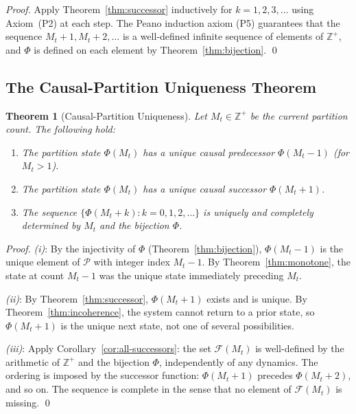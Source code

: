 \documentclass[twocolumn,10pt,a4paper]{article}
\theoremstyle{thmstyle}
\newtheorem{theorem}{Theorem}[section]
\theoremstyle{definition}
\theoremstyle{remark}
\newcommand{\Zp}{\mathbb{Z}^{+}}
\newcommand{\Parts}{\mathcal{P}}
\newcommand{\PhiMap}{\varPhi}
\begin{document}
\begin{proof}
Apply Theorem~\ref{thm:successor} inductively for $k = 1, 2, 3, \ldots$ using Axiom~(P2) at each step. The Peano induction axiom (P5) guarantees that the sequence $M_t + 1, M_t + 2, \ldots$ is a well-defined infinite sequence of elements of $\Zp$, and $\PhiMap$ is defined on each element by Theorem~\ref{thm:bijection}. \qed
\end{proof}

\subsection{The Causal-Partition Uniqueness Theorem}

\begin{theorem}[Causal-Partition Uniqueness]
\label{thm:cpu}
Let $M_t \in \Zp$ be the current partition count. The following hold:
\begin{enumerate}[leftmargin=1.5em,label=(\roman*),itemsep=0.2em]
\item The partition state $\PhiMap(M_t)$ has a unique causal predecessor $\PhiMap(M_t - 1)$ (for $M_t > 1$).
\item The partition state $\PhiMap(M_t)$ has a unique causal successor $\PhiMap(M_t + 1)$.
\item The sequence $\{\PhiMap(M_t + k) : k = 0, 1, 2, \ldots\}$ is uniquely and completely determined by $M_t$ and the bijection $\PhiMap$.
\end{enumerate}
\end{theorem}

\begin{proof}
\textit{(i)}: By the injectivity of $\PhiMap$ (Theorem~\ref{thm:bijection}), $\PhiMap(M_t - 1)$ is the unique element of $\Parts$ with integer index $M_t - 1$. By Theorem~\ref{thm:monotone}, the state at count $M_t - 1$ was the unique state immediately preceding $M_t$.

\textit{(ii)}: By Theorem~\ref{thm:successor}, $\PhiMap(M_t + 1)$ exists and is unique. By Theorem~\ref{thm:incoherence}, the system cannot return to a prior state, so $\PhiMap(M_t + 1)$ is the unique next state, not one of several possibilities.

\textit{(iii)}: Apply Corollary~\ref{cor:all-successors}: the set $\mathcal{F}(M_t)$ is well-defined by the arithmetic of $\Zp$ and the bijection $\PhiMap$, independently of any dynamics. The ordering is imposed by the successor function: $\PhiMap(M_t + 1)$ precedes $\PhiMap(M_t + 2)$, and so on. The sequence is complete in the sense that no element of $\mathcal{F}(M_t)$ is missing. \qed
\end{proof}
\end{document}
